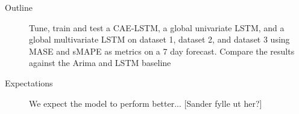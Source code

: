 \begin{description}
  \item[Outline]{Tune, train and test a CAE-LSTM, a global univariate LSTM,
              and a global multivariate LSTM on dataset 1,
              dataset 2, and dataset 3 using MASE and sMAPE as metrics on a 7 day forecast. Compare the results against the Arima and LSTM baseline}
\end{description}

\begin{description}
  \item[Expectations]{
              We expect the model to perform better... [Sander fylle ut her?]
        }
\end{description}